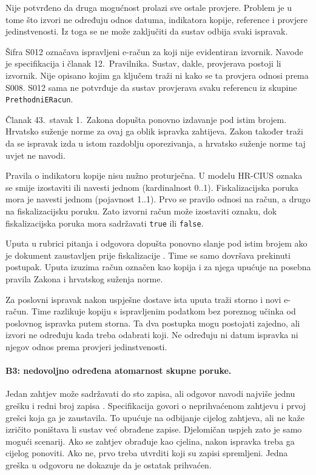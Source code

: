 Nije potvrđeno da druga mogućnost prolazi sve ostale provjere. Problem je u
tome što izvori ne određuju odnos datuma, indikatora kopije, reference i
provjere jedinstvenosti. Iz toga se ne može zaključiti da sustav odbija
svaki ispravak.

Šifra S012 označava ispravljeni e-račun za koji nije evidentiran izvornik.
Navode je specifikacija i članak 12.\ Pravilnika. Sustav, dakle, provjerava
postoji li izvornik. Nije opisano kojim ga ključem traži ni kako se ta
provjera odnosi prema S008. S012 sama ne potvrđuje da sustav provjerava
svaku referencu iz skupine \texttt{PrethodniERacun}.

Članak 43.\ stavak 1.\ Zakona dopušta ponovno izdavanje pod istim brojem.
Hrvatsko suženje norme za ovaj ga oblik ispravka zahtijeva. Zakon također
traži da se ispravak izda u istom razdoblju oporezivanja, a hrvatsko
suženje norme taj uvjet ne navodi.

Pravila o indikatoru kopije nisu nužno proturječna. U modelu HR-CIUS oznaka
se smije izostaviti ili navesti jednom (kardinalnost 0..1).
Fiskalizacijska poruka mora je navesti jednom (pojavnost 1..1). Prvo se
pravilo odnosi na račun, a drugo na fiskalizacijsku poruku. Zato izvorni
račun može izostaviti oznaku, dok fiskalizacijska poruka mora sadržavati
\texttt{true} ili \texttt{false}.

Uputa u rubrici pitanja i odgovora dopušta ponovno slanje pod istim brojem
ako je dokument zaustavljen prije fiskalizacije
\cite{pu2026pitanjaodgovori}. Time se samo dovršava prekinuti postupak.
Uputa izuzima račun označen kao kopija i za njega upućuje na posebna pravila
Zakona i hrvatskog suženja norme.

Za poslovni ispravak nakon uspješne dostave ista uputa traži storno i novi
e-račun. Time razlikuje kopiju s ispravljenim podatkom bez poreznog učinka
od poslovnog ispravka putem storna. Ta dva postupka mogu postojati zajedno,
ali izvori ne određuju kada treba odabrati koji. Ne određuju ni datum
ispravka ni njegov odnos prema provjeri jedinstvenosti.

\paragraph{B3: nedovoljno određena atomarnost skupne poruke.}
Jedan zahtjev može sadržavati do sto zapisa, ali odgovor navodi najviše
jednu grešku i redni broj zapisa \cite{pu2026tehspec}. Specifikacija govori
o neprihvaćenom zahtjevu i prvoj grešci koja ga je zaustavila. To upućuje na
odbijanje cijelog zahtjeva, ali ne kaže izričito poništava li sustav već
obrađene zapise. Djelomičan uspjeh zato je samo mogući scenarij. Ako se
zahtjev obrađuje kao cjelina, nakon ispravka treba ga cijelog ponoviti. Ako
ne, prvo treba utvrditi koji su zapisi spremljeni. Jedna greška u odgovoru
ne dokazuje da je ostatak prihvaćen.

